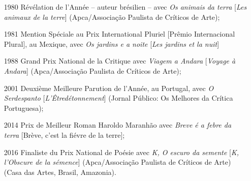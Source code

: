 \begin{enumerate}
\item[1980] Révélation de l'Année -- auteur brésilien -- avec \emph{Os animais
da terra} [\emph{Les animaux de la terre}] (Apca/Associação Paulista de Críticos de Arte);

\item[1981] Mention Spéciale au Prix International Pluriel [Prêmio
Internacional Plural], au Mexique, avec \emph{Os jardins e a noite} [\emph{Les jardins et la nuit}]

\item[1988] Grand Prix National de la Critique avec \emph{Viagem a Andara} [\emph{Voyage à Andara}]
(Apca/Associação Paulista de Críticos de Arte);

\item[2001] Deuxième Meilleure Parution de l'Année, au Portugal, avec \emph{O Serdespanto} [\emph{L'Êtredétonnement}] (Jornal Público: Os Melhores da Crítica Portuguesa);

\item[2014] Prix de Meilleur Roman Haroldo Maranhão avec \emph{Breve é a
febre da terra} [Brève, c'est la fiévre de la terre];

\item[2016] Finaliste du Prix National de Poésie avec \emph{K, O escuro da semente} [\emph{K, l'Obscure de la sémence}] (Apca/Associação Paulista de Críticos de Arte) (Casa das Artes, Brasil, Amazonia).
\end{enumerate}